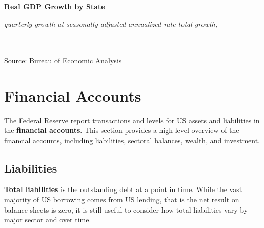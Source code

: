 \documentclass{report}
\begin{document}
\normalsize \textbf{Real GDP Growth by State}\\
\footnotesize{\textit{quarterly growth at seasonally adjusted annualized rate \hspace{20mm} total growth, }\\ 

\vspace{-4.5mm}
\hspace{-2mm} \noindent {} \setlength{\tabcolsep}{3.7pt} \color{black!90}
		{\renewcommand{\arraystretch}{1.44}
		 \begin{tabular}{p{30mm} R{7mm} R{7mm} R{7mm} R{7mm} R{7mm} p{0mm} R{9mm} R{9mm} R{10mm} }
		 \hline
		\end{tabular}}	\\

\vspace{-3mm}	
\footnotesize{Source: Bureau of Economic Analysis}

\newpage
\hypertarget{ofa}{}
\begin{minipage}{0.76\textwidth}
\section*{Financial Accounts}
\small The Federal Reserve \href{https://www.federalreserve.gov/releases/z1/}{report} transactions and levels for US assets and liabilities in the \textbf{financial accounts}. This section provides a high-level overview of the financial accounts, including liabilities, sectoral balances, wealth, and investment. 
\subsection*{Liabilities}
\small \textbf{Total liabilities} is the outstanding debt at a point in time. While the vast majority of US borrowing comes from US lending, that is the net result on balance sheets is zero, it is still useful to consider how total liabilities vary by major sector and over time. 


\vspace{1mm}


\end{minipage}}
\end{document}
